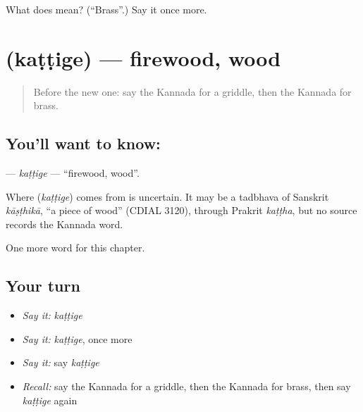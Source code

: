 \begin{tcolorbox}[breakable,colback=teal!4,colframe=teal!35!black,title={Before you move on}]
What does  mean? (\textquotedblleft{}Brass\textquotedblright{}.) Say it once more.
\end{tcolorbox}
\section[\texorpdfstring{\kn{ಕಟ್ಟಿಗೆ} (kaṭṭige)}{ಕಟ್ಟಿಗೆ (kaṭṭige)}]{ (kaṭṭige) — firewood, wood}

\label{lesson:KA-C302-kattige}



\begin{quote}
Before the new one: say the Kannada for a griddle, then the Kannada for brass.
\end{quote}

\subsection*{You'll want to know: }
\textbf{} — \emph{kaṭṭige} — \textquotedblleft{}firewood, wood\textquotedblright{}.

\begin{cousinweb}
Where \textbf{} (\emph{kaṭṭige}) comes from is uncertain. It may be a tadbhava of Sanskrit \emph{kāṣṭhikā}, \textquotedblleft{}a piece of wood\textquotedblright{} (CDIAL 3120), through Prakrit \emph{kaṭṭha}, but no source records the Kannada word.
\end{cousinweb}

\begin{grammarlens}[title={What you've built}]
One more word for this chapter.
\end{grammarlens}

\subsection*{Your turn}
\begin{itemize}
\raggedright
  \item \emph{Say it:} \emph{kaṭṭige}
  \item \emph{Say it:} \emph{kaṭṭige}, once more
  \item \emph{Say it:} say \emph{kaṭṭige}
  \item \emph{Recall:} say the Kannada for a griddle, then the Kannada for brass, then say \emph{kaṭṭige} again
\end{itemize}

